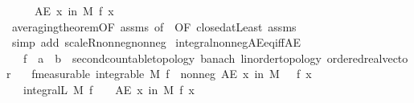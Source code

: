 \begin{isabellebody}
\ \ \ \ \ {\isachardoublequoteopen}AE\ x\ in\ M{\isachardot}{\kern0pt}\ f\ x\ {\isasymge}\ {}{\isachardoublequoteclose}\isanewline
%
\isadelimproof
\ \ %
\endisadelimproof
%
\isatagproof
{}\isamarkupfalse%
\ averaging{\isacharunderscore}{\kern0pt}theorem{\isacharbrackleft}{\kern0pt}OF\ assms{\isacharparenleft}{\kern0pt}{}{\isacharparenright}{\kern0pt}{\isacharcomma}{\kern0pt}\ of\ {\isachardoublequoteopen}{\isacharbraceleft}{\kern0pt}{}{\isachardot}{\kern0pt}{\isachardot}{\kern0pt}{\isacharbraceright}{\kern0pt}{\isachardoublequoteclose}{\isacharcomma}{\kern0pt}\ OF\ closed{\isacharunderscore}{\kern0pt}atLeast{\isacharbrackright}{\kern0pt}\ assms{\isacharparenleft}{\kern0pt}{}{\isacharparenright}{\kern0pt}\isanewline
\ \ \isamarkupfalse%
\ {\isacharparenleft}{\kern0pt}simp\ add{\isacharcolon}{\kern0pt}\ scaleR{\isacharunderscore}{\kern0pt}nonneg{\isacharunderscore}{\kern0pt}nonneg{\isacharparenright}{\kern0pt}%
\endisatagproof
{\isafoldproof}%
%
\isadelimproof
\isanewline
%
\endisadelimproof
\isanewline
{}\isamarkupfalse%
\ integral{\isacharunderscore}{\kern0pt}nonneg{\isacharunderscore}{\kern0pt}AE{\isacharunderscore}{\kern0pt}eq{\isacharunderscore}{\kern0pt}{}{\isacharunderscore}{\kern0pt}iff{\isacharunderscore}{\kern0pt}AE{\isacharcolon}{\kern0pt}\isanewline
\ \ \ f\ {\isacharcolon}{\kern0pt}{\isacharcolon}{\kern0pt}\ {\isachardoublequoteopen}{\isacharprime}{\kern0pt}a\ {\isasymRightarrow}\ {\isacharprime}{\kern0pt}b\ {\isacharcolon}{\kern0pt}{\isacharcolon}{\kern0pt}\ {\isacharbraceleft}{\kern0pt}second{\isacharunderscore}{\kern0pt}countable{\isacharunderscore}{\kern0pt}topology{\isacharcomma}{\kern0pt}\ banach{\isacharcomma}{\kern0pt}\ linorder{\isacharunderscore}{\kern0pt}topology{\isacharcomma}{\kern0pt}\ ordered{\isacharunderscore}{\kern0pt}real{\isacharunderscore}{\kern0pt}vector{\isacharbraceright}{\kern0pt}{\isachardoublequoteclose}\isanewline
\ \ \ f{\isacharbrackleft}{\kern0pt}measurable{\isacharbrackright}{\kern0pt}{\isacharcolon}{\kern0pt}\ {\isachardoublequoteopen}integrable\ M\ f{\isachardoublequoteclose}\ \ nonneg{\isacharcolon}{\kern0pt}\ {\isachardoublequoteopen}AE\ x\ in\ M{\isachardot}{\kern0pt}\ {}\ {\isasymle}\ f\ x{\isachardoublequoteclose}\isanewline
\ \ \ {\isachardoublequoteopen}integral\isactrlsup L\ M\ f\ {\isacharequal}{\kern0pt}\ {}\ {\isasymlongleftrightarrow}\ {\isacharparenleft}{\kern0pt}AE\ x\ in\ M{\isachardot}{\kern0pt}\ f\ x\ {\isacharequal}{\kern0pt}\ {}{\isacharparenright}{\kern0pt}{\isachardoublequoteclose}\isanewline

\end{isabellebody}

